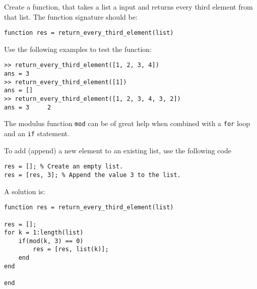 \begin{ex}
Create a function, that takes a list a input and returns every third element from that list.
The function signature should be:
\begin{lstlisting}
function res = return_every_third_element(list)
\end{lstlisting}
Use the following examples to test the function:
\begin{lstlisting}
>> return_every_third_element([1, 2, 3, 4])
ans = 3
>> return_every_third_element([1])
ans = []
>> return_every_third_element([1, 2, 3, 4, 3, 2])
ans = 3     2
\end{lstlisting}
\begin{hint}
The modulus function \verb!mod! can be of great help
when combined with a \verb!for! loop and an \verb!if! statement.

To add (append) a new element to an existing list, 
use the following code
\begin{lstlisting}
res = []; % Create an empty list.
res = [res, 3]; % Append the value 3 to the list.
\end{lstlisting}
\end{hint}
\begin{sol}
A solution is:
\begin{lstlisting}
function res = return_every_third_element(list)

res = [];
for k = 1:length(list)
    if(mod(k, 3) == 0)
        res = [res, list(k)];
    end
end

end
\end{lstlisting}
\end{sol}
\end{ex}


